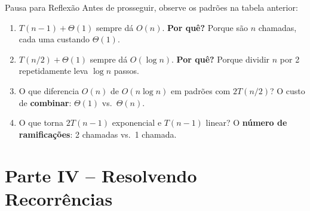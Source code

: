 \documentclass[aspectratio=169]{beamer}
\begin{document}
\begin{frame}{Pausa para Reflexão}
    Antes de prosseguir, observe os padrões na tabela anterior:
    
    \vspace{0.4cm}
    \begin{enumerate}
        \item $T(n{-}1) + \Theta(1)$ sempre dá $O(n)$. \textbf{Por quê?}
        {\small Porque são $n$ chamadas, cada uma custando $\Theta(1)$.}
        
        \vspace{0.2cm}
        \item $T(n/2) + \Theta(1)$ sempre dá $O(\log n)$. \textbf{Por quê?}
        {\small Porque dividir $n$ por 2 repetidamente leva $\log n$ passos.}
        
        \vspace{0.2cm}
        \item O que diferencia $O(n)$ de $O(n \log n)$ em padrões com $2T(n/2)$?
        {\small O custo de \textbf{combinar}: $\Theta(1)$ vs.\ $\Theta(n)$.}
        
        \vspace{0.2cm}
        \item O que torna $2T(n{-}1)$ exponencial e $T(n{-}1)$ linear?
        {\small O \textbf{número de ramificações}: 2 chamadas vs.\ 1 chamada.}
    \end{enumerate}
\end{frame}

\section{Parte IV -- Resolvendo Recorrências}
\end{document}
